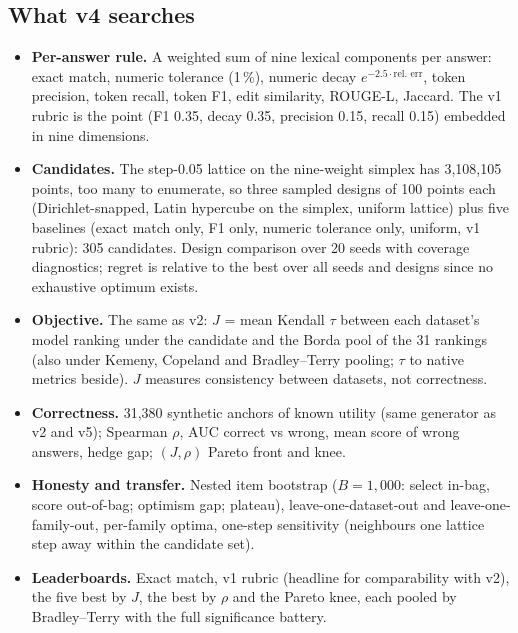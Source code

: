 \documentclass[11pt]{article}
\begin{document}
\subsection{What v4 searches}
\begin{itemize}
\item \textbf{Per-answer rule.} A weighted sum of nine lexical components per answer: exact match, numeric tolerance (1\,\%), numeric decay $e^{-2.5\cdot\text{rel.\ err}}$, token precision, token recall, token F1, edit similarity, ROUGE-L, Jaccard. The v1 rubric is the point (F1 0.35, decay 0.35, precision 0.15, recall 0.15) embedded in nine dimensions.
\item \textbf{Candidates.} The step-0.05 lattice on the nine-weight simplex has 3,108,105 points, too many to enumerate, so three sampled designs of 100 points each (Dirichlet-snapped, Latin hypercube on the simplex, uniform lattice) plus five baselines (exact match only, F1 only, numeric tolerance only, uniform, v1 rubric): 305 candidates. Design comparison over 20 seeds with coverage diagnostics; regret is relative to the best over all seeds and designs since no exhaustive optimum exists.
\item \textbf{Objective.} The same as v2: $J$ = mean Kendall $\tau$ between each dataset's model ranking under the candidate and the Borda pool of the 31 rankings (also under Kemeny, Copeland and Bradley--Terry pooling; $\tau$ to native metrics beside). $J$ measures consistency between datasets, not correctness.
\item \textbf{Correctness.} 31,380 synthetic anchors of known utility (same generator as v2 and v5); Spearman $\rho$, AUC correct vs wrong, mean score of wrong answers, hedge gap; $(J,\rho)$ Pareto front and knee.
\item \textbf{Honesty and transfer.} Nested item bootstrap ($B = 1{,}000$: select in-bag, score out-of-bag; optimism gap; plateau), leave-one-dataset-out and leave-one-family-out, per-family optima, one-step sensitivity (neighbours one lattice step away within the candidate set).
\item \textbf{Leaderboards.} Exact match, v1 rubric (headline for comparability with v2), the five best by $J$, the best by $\rho$ and the Pareto knee, each pooled by Bradley--Terry with the full significance battery.
\end{itemize}
\end{document}
